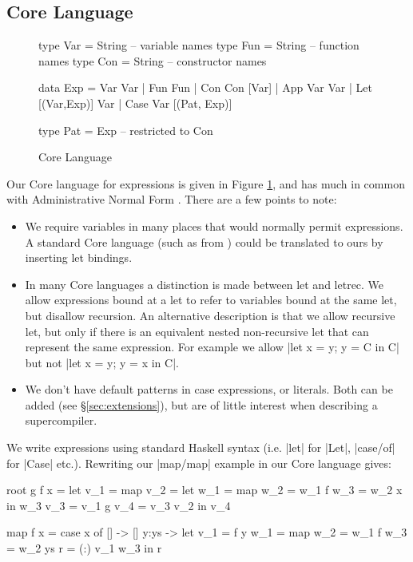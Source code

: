 \documentclass{sigplanconf}
\begin{document}
\subsection{Core Language}
\label{sec:core}

\begin{figure}
\begin{code}
type Var  = String -- variable names
type Fun  = String -- function names
type Con  = String -- constructor names

data Exp  =  Var Var
          |  Fun Fun
          |  Con Con [Var]
          |  App Var Var
          |  Let [(Var,Exp)] Var
          |  Case Var [(Pat, Exp)]

type Pat = Exp -- restricted to Con
\end{code}
\caption{Core Language}
\label{fig:core}
\end{figure}

Our Core language for expressions is given in Figure \ref{fig:core}, and has much in common with Administrative Normal Form \cite{flanagan:continuations}. There are a few points to note:

\begin{itemize}
\item We require variables in many places that would normally permit expressions. A standard Core language (such as from \citet{ghc_core}) could be translated to ours by inserting let bindings.
\item In many Core languages a distinction is made between let and letrec. We allow expressions bound at a let to refer to variables bound at the same let, but disallow recursion. An alternative description is that we allow recursive let, but only if there is an equivalent nested non-recursive let that can represent the same expression. For example we allow |let x = y; y = C in C| but not |let x = y; y = x in C|.
\item We don't have default patterns in case expressions, or literals. Both can be added (see \S\ref{sec:extensions}), but are of little interest when describing a supercompiler.
\end{itemize}

We write expressions using standard Haskell syntax (i.e. |let| for |Let|, |case/of| for |Case| etc.). Rewriting our |map/map| example in our Core language gives:

\begin{code}
root g f x =  let  v_1 = map
                   v_2 = let  w_1 = map
                              w_2 = w_1 f
                              w_3 = w_2 x
                         in   w_3
                   v_3 = v_1 g
                   v_4 = v_3 v_2
              in   v_4

map f x = case x of
    [] -> []
    y:ys -> let  v_1 = f y
                 w_1 = map
                 w_2 = w_1 f
                 w_3 = w_2 ys
                 r = (:) v_1 w_3
            in   r
\end{code}
\end{document}
